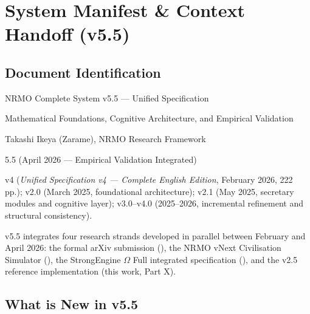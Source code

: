 
\chapter*{System Manifest \& Context Handoff (v5.5)}

\section*{Document Identification}

\begin{description}[leftmargin=0pt,style=nextline]
\item[Title]
NRMO Complete System v5.5 --- Unified Specification
\item[Subtitle]
Mathematical Foundations, Cognitive Architecture, and Empirical Validation
\item[Author]
Takashi Ikeya (Zarame), NRMO Research Framework
\item[Version]
5.5 (April 2026 --- Empirical Validation Integrated)
\item[Predecessors]
v4 (\textit{Unified Specification v4 --- Complete English Edition},
February 2026, 222\,pp.); v2.0 (March 2025, foundational architecture);
v2.1 (May 2025, secretary modules and cognitive layer); v3.0--v4.0 (2025--2026,
incremental refinement and structural consistency).
\item[Build context]
v5.5 integrates four research strands developed in parallel between
February and April 2026: the formal arXiv submission
(\cite{Ikeya2026arXiv}), the NRMO vNext Civilisation Simulator
(\cite{Ikeya2026vNext}), the StrongEngine $\Omega$ Full integrated
specification (\cite{Ikeya2026Integrated}), and the v2.5 reference
implementation (this work, Part X).
\end{description}

\section*{What is New in v5.5}

